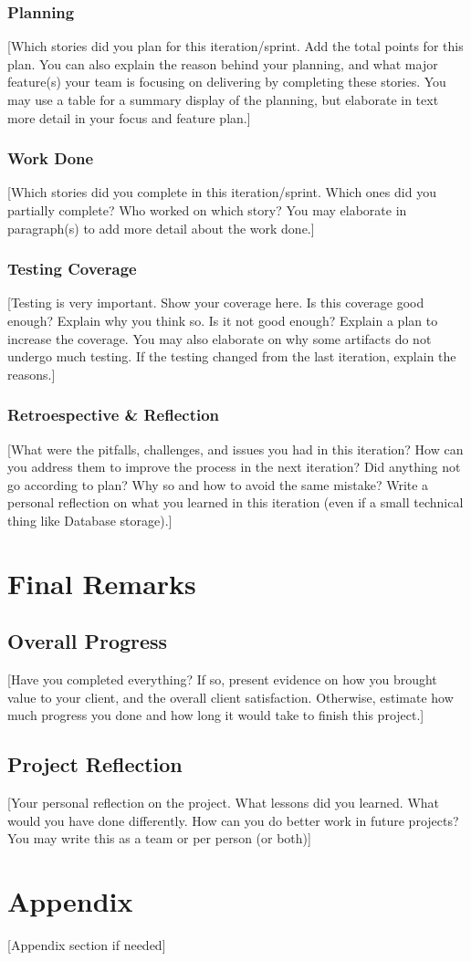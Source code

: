 \documentclass{article}
\begin{document}
\subsubsection{Planning}
[Which stories did you plan for this iteration/sprint. Add the total points for this plan. You can also explain the reason behind your planning, and what major feature(s) your team is focusing on delivering by completing these stories. You may use a table for a summary display of the planning, but elaborate in text more detail in your focus and feature plan.]

\subsubsection{Work Done}
[Which stories did you complete in this iteration/sprint. Which ones did you partially complete? Who worked on which story? You may elaborate in paragraph(s) to add more detail about the work done.]

\subsubsection{Testing Coverage}
[Testing is very important. Show your coverage here. Is this coverage good enough? Explain why you think so. Is it not good enough? Explain a plan to increase the coverage. You may also elaborate on why some artifacts do not undergo much testing. If the testing changed from the last iteration, explain the reasons.]

\subsubsection{Retroespective \& Reflection}
[What were the pitfalls, challenges, and issues you had in this iteration? How can you address them to improve the process in the next iteration? Did anything not go according to plan? Why so and how to avoid the same mistake? Write a personal reflection on what you learned in this iteration (even if a small technical thing like Database storage).]

\section{Final Remarks}

\subsection{Overall Progress}
[Have you completed everything? If so, present evidence on how you brought value to your client, and the overall client satisfaction. Otherwise, estimate how much progress you done and how long it would take to finish this project.]

\subsection{Project Reflection}
[Your personal reflection on the project. What lessons did you learned. What would you have done differently. How can you do better work in future projects? You may write this as a team or per person (or both)]

\section*{Appendix}
[Appendix section if needed]
\end{document}
